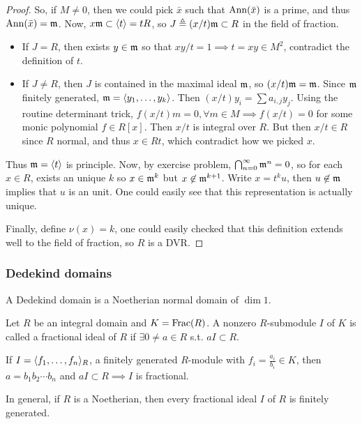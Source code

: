 \begin{prop}
\begin{proof}
    So, if $M \neq 0$, then we could pick $\bar{x}$ such that $\operatorname{Ann}(\bar{x})$
    is a prime, and thus $\operatorname{Ann}(\bar{x}) = \mathfrak{m}$.
    Now, $x \mathfrak{m} \subset \langle t\rangle = tR$, so $J \triangleq (x/t) \mathfrak{m} \subset R$ in the field of fraction.
    \begin{itemize}
      \item If $J = R$, then exists $y \in \mathfrak{m}$ so that $xy / t = 1 \implies t = xy \in M^2$,
        contradict the definition of $t$.
      \item If $J \neq R$, then $J$ is contained in the maximal ideal $\mathfrak{m}$,
        so $(x/t) \mathfrak{m} = \mathfrak{m}$. Since $\mathfrak{m}$ finitely generated, $\mathfrak{m} = \langle y_1, \dots, y_k\rangle$.
        Then $(x/t) y_i = \sum a_{i, j} y_j$. Using the routine determinant trick,
        $f(x/t) m = 0, \forall m \in M \implies f(x/t) = 0$ for some monic polynomial $f \in R[x]$.
        Then $x/t$ is integral over $R$. But then $x/t \in R$ since $R$ normal,
        and thus $x \in Rt$, which contradict how we picked $x$.
    \end{itemize}

    Thus $\mathfrak{m} = \langle t\rangle$ is principle. Now, by exercise problem,
    $\bigcap_{n = 0}^\infty \mathfrak{m}^n = 0$, so for each $x \in R$,
    exists an unique $k$ so $x \in \mathfrak{m}^k$ but $x \not\in \mathfrak{m}^{k+1}$.
    Write $x = t^k u$, then $u \not\in \mathfrak{m}$ implies that $u$
    is an unit. One could easily see that this representation is
    actually unique.

    Finally, define $\nu(x) = k$, one could easily checked
    that this definition extends well to the field of fraction,
    so $R$ is a DVR.
  \end{proof}
\end{prop}

\subsubsection{Dedekind domains}
\begin{definition}
  A Dedekind domain is a Noetherian normal domain of $\dim 1$.
\end{definition}

\begin{definition}
  Let $R$ be an integral domain and $K = \operatorname{Frac}(R)$.
  A nonzero $R$-submodule $I$ of $K$ is called a fractional ideal of $R$ if
  $\exists 0 \ne a \in R$ s.t. $aI \subset R$.
\end{definition}

\begin{example} \label{eg:finitely-generated-is-fractional-ideal}
  If $I = \langle f_1, \dots, f_n\rangle_R$, a finitely generated $R$-module
  with $f_i = \frac{a_i}{b_i} \in K$, then
  $a = b_1b_2 \dotsm b_n$ and $aI \subset R \implies I$ is fractional.

  In general, if $R$ is a Noetherian, then every fractional ideal $I$ of $R$
  is finitely generated.
\end{example}

